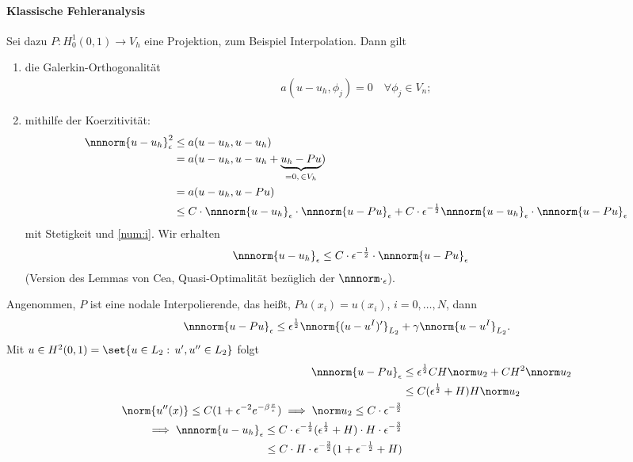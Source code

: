 \paragraph{Klassische Fehleranalysis}
Sei dazu $P: H_{0}^{1}(0, 1) \to V_{h}$ eine Projektion, zum Beispiel Interpolation. Dann gilt
\begin{enumerate}
\item \label{num:i} die Galerkin-Orthogonalität
  \begin{align*}
    a(u - u_{h}, \phi_{j}) = 0 \quad \forall \phi_{j}\in V_{n};
  \end{align*}
\item \label{num:ii}mithilfe der Koerzitivität:
  \begin{align*}
     \nnnorm{u-u_{h}}_{\epsilon}^{2} &\leq a(u-u_{h}, u- u_{h})\\
     &= a(u-u_{h}, u-u_{h}+ \underbrace{u_{h} - Pu}_{= 0, \, \in V_{h}})\\
     &= a(u-u_{h}, u- Pu)\\
     &\leq C\cdot \nnnorm{u-u_{h}}_{\epsilon} \cdot\nnnorm{u-Pu}_{\epsilon} + C\cdot \epsilon^{-\frac 12} \nnnorm{u-u_{h}}_{\epsilon}\cdot\nnnorm{u-Pu}_{\epsilon}
  \end{align*}
mit Stetigkeit und \ref{num:i}. Wir erhalten
\begin{align*}
   \nnnorm{u-u_{h}}_{\epsilon} &\leq  C\cdot \epsilon^{-\frac 12} \cdot \nnnorm{u-Pu}_{\epsilon}
\end{align*}
(Version des Lemmas von Cea, Quasi-Optimalität bezüglich der $\nnnorm\cdot_{\epsilon}$). 
\end{enumerate}
Angenommen, $P$ ist eine nodale Interpolierende, das heißt, $Pu(x_{i}) = u(x_{i})$, $i = 0, \dots, N$, dann
\begin{align*}
  \nnnorm{u-Pu}_{\epsilon} \leq \epsilon^{\frac 12}\nnorm{(u-u^{I})'}_{L_{2}} + \gamma \nnorm{u-u^{I}}_{L_{2}}. 
\end{align*}
Mit $u \in H^{2}(0, 1) = \set{u \in L_{2}: \,  u', u'' \in L_{2}}$ folgt
\begin{align*}
  \nnnorm{u - Pu}_{\epsilon} &\leq \epsilon^{\frac 12} C H\norm u_{2} + CH^{2} \nnorm u_{2}\\
  &\leq C(\epsilon^{\frac 12} + H) H\norm u_{2} \\
\norm{u''(x)}\leq C(1 + \epsilon^{-2}e^{- \beta \frac x \epsilon}) \implies \norm u_{2} \leq C\cdot\epsilon^{- \frac 32}\\
\implies \nnnorm{u-u_{h}}_{\epsilon} \leq C \cdot \epsilon^{- \frac 12}(\epsilon^{\frac 12} + H)\cdot H\cdot \epsilon^{- \frac 32}\\
\leq C \cdot H\cdot \epsilon^{- \frac 32}(1 + \epsilon^{-\frac 12} + H)
\end{align*}
